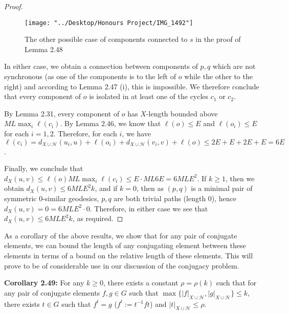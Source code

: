 \documentclass[12pt]{article}
\newcommand{\vs}{\vskip10pt}
\begin{document}
\begin{proof}
\begin{figure} [H]
	\centering
	\texttt{[image: "../Desktop/Honours Project/IMG\_1492"]}
	\caption{The other possible case of components connected to $s$ in the proof of Lemma 2.48}
	\label{fig:img1492}
\end{figure}

		In either case, we obtain a connection between components of $p,q$ which are not synchronous (as one of the components is to the left of $o$ while the other to the right) and according to Lemma 2.47 (i), this is impossible. We therefore conclude that every component of $o$ is isolated in at least one of the cycles $c_1$ or $c_2$. 
		
		\vs 
		
		By Lemma 2.31, every component of $o$ has $X$-length bounded above $ML \max_i \ell(c_i)$. By Lemma 2.46, we know that $\ell(o) \leq E$ and $\ell(o_i) \leq E$ for each $i=1,2$. Therefore, for each $i$, we have $\ell(c_i) = d_{X \cup \mathcal{H}}(u_i, u) + \ell(o_i) + d_{X \cup \mathcal{H}} (v_i, v) + \ell(o) \leq 2E + E + 2E + E = 6E$. 
		
		\vs 
		
		Finally, we conclude that $d_X(u,v) \leq \ell(o) ML \max_i \ell(c_i) \leq E \cdot ML6E = 6MLE^2$. If $k \geq 1$, then we obtain $d_X(u,v) \leq 6 ML E^2 k$, and if $k = 0$, then as $(p,q)$ is a minimal pair of symmetric 0-similar geodesics, $p,q$ are both trivial paths (length 0), hence $d_X(u,v) = 0 = 6ML E^2 \cdot 0$. Therefore, in either case we see that $d_X (u,v) \leq 6 ML E^2 k$, as required. 
		
	\end{proof}

	As a corollary of the above results, we show that for any pair of conjugate elements, we can bound the length of any conjugating element between these elements in terms of a bound on the relative length of these elements. This will prove to be of considerable use in our discussion of the conjugacy problem. 
	
	\vs 
	
	\textbf{Corollary 2.49: } For any $k \geq 0$, there exists a constant $\rho = \rho(k)$ such that for any pair of conjugate elements $f,g \in G$ such that $\max \{\vert f \vert_{X \cup \mathcal{H}}, \vert g \vert_{X \cup \mathcal{H}}\} \leq k$, there exists $t \in G$ such that $f^t = g$ ($f^t := t^{-1} f t$) and $\vert t \vert_{X \cup \mathcal{H}} \leq \rho$. 
	
\end{document}
